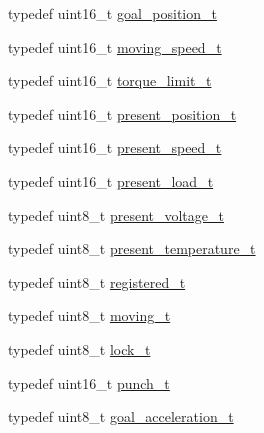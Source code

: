 \begin{DoxyCompactItemize}
\item 
typedef uint16\+\_\+t \hyperlink{structdynamixel_1_1servos_1_1_model_traits_3_01_mx28_01_4_1_1_c_t_a2a21e80c695ce8840149b281ed9e5d28}{goal\+\_\+position\+\_\+t}
\item 
typedef uint16\+\_\+t \hyperlink{structdynamixel_1_1servos_1_1_model_traits_3_01_mx28_01_4_1_1_c_t_a901aa8deec6e2eeebe38986f4ec1a2d8}{moving\+\_\+speed\+\_\+t}
\item 
typedef uint16\+\_\+t \hyperlink{structdynamixel_1_1servos_1_1_model_traits_3_01_mx28_01_4_1_1_c_t_a418e386ee5c30a82a04d06cd3469b93e}{torque\+\_\+limit\+\_\+t}
\item 
typedef uint16\+\_\+t \hyperlink{structdynamixel_1_1servos_1_1_model_traits_3_01_mx28_01_4_1_1_c_t_a243a6450847a7a66fef20cd8128253e0}{present\+\_\+position\+\_\+t}
\item 
typedef uint16\+\_\+t \hyperlink{structdynamixel_1_1servos_1_1_model_traits_3_01_mx28_01_4_1_1_c_t_a267e57f50da28e002e6a58339b880851}{present\+\_\+speed\+\_\+t}
\item 
typedef uint16\+\_\+t \hyperlink{structdynamixel_1_1servos_1_1_model_traits_3_01_mx28_01_4_1_1_c_t_a25cbea11831a198cde77ead07b71dfee}{present\+\_\+load\+\_\+t}
\item 
typedef uint8\+\_\+t \hyperlink{structdynamixel_1_1servos_1_1_model_traits_3_01_mx28_01_4_1_1_c_t_a4543561b2a671a931c4fad3b2dbf2300}{present\+\_\+voltage\+\_\+t}
\item 
typedef uint8\+\_\+t \hyperlink{structdynamixel_1_1servos_1_1_model_traits_3_01_mx28_01_4_1_1_c_t_a51567688610142dc060c066256aabe63}{present\+\_\+temperature\+\_\+t}
\item 
typedef uint8\+\_\+t \hyperlink{structdynamixel_1_1servos_1_1_model_traits_3_01_mx28_01_4_1_1_c_t_a13d66792665df0d697b040c4d59519e1}{registered\+\_\+t}
\item 
typedef uint8\+\_\+t \hyperlink{structdynamixel_1_1servos_1_1_model_traits_3_01_mx28_01_4_1_1_c_t_a942ee733e0dd4baba34be33c9055e397}{moving\+\_\+t}
\item 
typedef uint8\+\_\+t \hyperlink{structdynamixel_1_1servos_1_1_model_traits_3_01_mx28_01_4_1_1_c_t_a3e968f80a15707e6bf3bb050cf013dcd}{lock\+\_\+t}
\item 
typedef uint16\+\_\+t \hyperlink{structdynamixel_1_1servos_1_1_model_traits_3_01_mx28_01_4_1_1_c_t_a6a0f5c17d6d63460a000b137f88865b3}{punch\+\_\+t}
\item 
typedef uint8\+\_\+t \hyperlink{structdynamixel_1_1servos_1_1_model_traits_3_01_mx28_01_4_1_1_c_t_ad0fc3eee171078bf455143bb6a0fb3f6}{goal\+\_\+acceleration\+\_\+t}
\end{DoxyCompactItemize}
